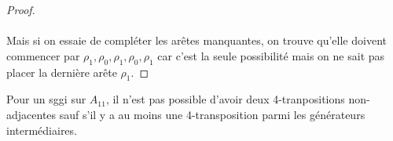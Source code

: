 \begin{proof}
\begin{figure}[H]
\begin{center}
\begin{tikzpicture}
    \end{tikzpicture}
    \caption{}
  \end{center}
\end{figure}

\paragraph{}
Mais si on essaie de compléter les arêtes manquantes, on trouve qu'elle doivent commencer par $\rho_1, \rho_0, \rho_1, \rho_0, \rho_1$ car c'est la seule possibilité mais on ne sait pas placer la dernière arête $\rho_1$.

\end{proof}

\begin{lemma}
  Pour un sggi sur $A_{11}$, il n'est pas possible d'avoir deux 4-tranpositions non-adjacentes sauf s'il y a au moins une 4-transposition parmi les générateurs intermédiaires.
\end{lemma}

